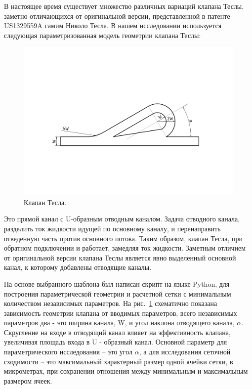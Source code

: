 \documentclass[10pt,a4paper]{book}
\begin{document}
    В настоящее время существует множество различных вариаций клапана Теслы, заметно отличающихся от оригинальной версии, представленной в патенте US1329559A самим Николо Тесла. В нашем исследовании используется следующая параметризованная модель геометрии клапана Теслы:
    
    \begin{figure}[H]
        \centering
        \includegraphics[width = 1\linewidth]{teslaDesign}
        \caption{Клапан Тесла.}
        \label{fig:td}
    \end{figure}
    
    Это прямой канал с U-образным отводным каналом. Задача отводного канала, разделить ток жидкости идущей по основному каналу, и перенаправить отведенную часть против основного потока. Таким образом, клапан Тесла, при обратном подключении и работает, замедляя ток жидкости. Заметным отличием от оригинальной версии клапана Теслы является явно выделенный основной канал, к которому добавлены отводящие каналы.          
    
    На основе выбранного шаблона был написан скрипт на языке Python, для построения параметрической геометрии и расчетной сетки с минимальным количеством независимых параметров. На рис.~\ref{fig:td} схематично показана зависимость геометрии клапана от вводимых параметров, всего независимых параметров два - это ширина канала, W, и угол наклона отводящего канала, $ \alpha  $. Скругление на входе в отводящий канал влияет на эффективность клапана, увеличивая площадь входа в U - образный канал. Основной параметр для параметрического исследования -- это угол $ \alpha  $, а для исследования сеточной сходимости -- это максимальный характерный размер одной ячейки сетки, в микрометрах, при сохранении отношения между минимальным и максимальным размером ячеек.
    
\end{document}
